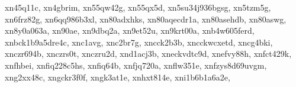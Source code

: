 \documentclass[letterpaper,10pt,english]{sphinxmanual}
\begin{document}
\begin{fulllineitems}
\begin{fulllineitems}
\textquotesingle{}xn\sphinxhyphen{}\sphinxhyphen{}45q11c\textquotesingle{}, \textquotesingle{}xn\sphinxhyphen{}\sphinxhyphen{}4gbrim\textquotesingle{}, \textquotesingle{}xn\sphinxhyphen{}\sphinxhyphen{}55qw42g\textquotesingle{}, \textquotesingle{}xn\sphinxhyphen{}\sphinxhyphen{}55qx5d\textquotesingle{}, \textquotesingle{}xn\sphinxhyphen{}\sphinxhyphen{}5su34j936bgsg\textquotesingle{}, \textquotesingle{}xn\sphinxhyphen{}\sphinxhyphen{}5tzm5g\textquotesingle{}, \textquotesingle{}xn\sphinxhyphen{}\sphinxhyphen{}6frz82g\textquotesingle{}, \textquotesingle{}xn\sphinxhyphen{}\sphinxhyphen{}6qq986b3xl\textquotesingle{}, \textquotesingle{}xn\sphinxhyphen{}\sphinxhyphen{}80adxhks\textquotesingle{}, \textquotesingle{}xn\sphinxhyphen{}\sphinxhyphen{}80aqecdr1a\textquotesingle{}, \textquotesingle{}xn\sphinxhyphen{}\sphinxhyphen{}80asehdb\textquotesingle{}, \textquotesingle{}xn\sphinxhyphen{}\sphinxhyphen{}80aswg\textquotesingle{}, \textquotesingle{}xn\sphinxhyphen{}\sphinxhyphen{}8y0a063a\textquotesingle{}, \textquotesingle{}xn\sphinxhyphen{}\sphinxhyphen{}90ae\textquotesingle{}, \textquotesingle{}xn\sphinxhyphen{}\sphinxhyphen{}9dbq2a\textquotesingle{}, \textquotesingle{}xn\sphinxhyphen{}\sphinxhyphen{}9et52u\textquotesingle{}, \textquotesingle{}xn\sphinxhyphen{}\sphinxhyphen{}9krt00a\textquotesingle{}, \textquotesingle{}xn\sphinxhyphen{}\sphinxhyphen{}b4w605ferd\textquotesingle{}, \textquotesingle{}xn\sphinxhyphen{}\sphinxhyphen{}bck1b9a5dre4c\textquotesingle{}, \textquotesingle{}xn\sphinxhyphen{}\sphinxhyphen{}c1avg\textquotesingle{}, \textquotesingle{}xn\sphinxhyphen{}\sphinxhyphen{}c2br7g\textquotesingle{}, \textquotesingle{}xn\sphinxhyphen{}\sphinxhyphen{}cck2b3b\textquotesingle{}, \textquotesingle{}xn\sphinxhyphen{}\sphinxhyphen{}cckwcxetd\textquotesingle{}, \textquotesingle{}xn\sphinxhyphen{}\sphinxhyphen{}cg4bki\textquotesingle{}, \textquotesingle{}xn\sphinxhyphen{}\sphinxhyphen{}czr694b\textquotesingle{}, \textquotesingle{}xn\sphinxhyphen{}\sphinxhyphen{}czrs0t\textquotesingle{}, \textquotesingle{}xn\sphinxhyphen{}\sphinxhyphen{}czru2d\textquotesingle{}, \textquotesingle{}xn\sphinxhyphen{}\sphinxhyphen{}d1acj3b\textquotesingle{}, \textquotesingle{}xn\sphinxhyphen{}\sphinxhyphen{}eckvdtc9d\textquotesingle{}, \textquotesingle{}xn\sphinxhyphen{}\sphinxhyphen{}efvy88h\textquotesingle{}, \textquotesingle{}xn\sphinxhyphen{}\sphinxhyphen{}fct429k\textquotesingle{}, \textquotesingle{}xn\sphinxhyphen{}\sphinxhyphen{}fhbei\textquotesingle{}, \textquotesingle{}xn\sphinxhyphen{}\sphinxhyphen{}fiq228c5hs\textquotesingle{}, \textquotesingle{}xn\sphinxhyphen{}\sphinxhyphen{}fiq64b\textquotesingle{}, \textquotesingle{}xn\sphinxhyphen{}\sphinxhyphen{}fjq720a\textquotesingle{}, \textquotesingle{}xn\sphinxhyphen{}\sphinxhyphen{}flw351e\textquotesingle{}, \textquotesingle{}xn\sphinxhyphen{}\sphinxhyphen{}fzys8d69uvgm\textquotesingle{}, \textquotesingle{}xn\sphinxhyphen{}\sphinxhyphen{}g2xx48c\textquotesingle{}, \textquotesingle{}xn\sphinxhyphen{}\sphinxhyphen{}gckr3f0f\textquotesingle{}, \textquotesingle{}xn\sphinxhyphen{}\sphinxhyphen{}gk3at1e\textquotesingle{}, \textquotesingle{}xn\sphinxhyphen{}\sphinxhyphen{}hxt814e\textquotesingle{}, \textquotesingle{}xn\sphinxhyphen{}\sphinxhyphen{}i1b6b1a6a2e\textquotesingle{}, 
\end{fulllineitems}
\end{fulllineitems}
\end{document}
